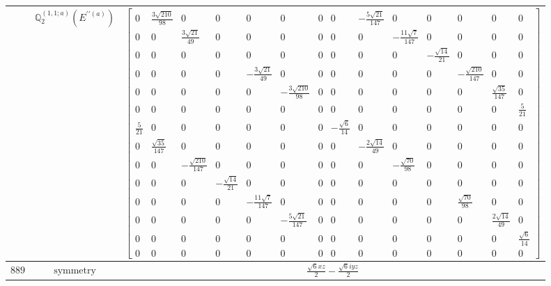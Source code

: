 \documentclass[fleqn,8pt,landscape]{jsarticle}
\begin{document}
\begin{longtable}{ccc}
$  $ & $ \mathbb{Q}_{2}^{(1,1;a)}(E^{\prime\prime(a)}) $ & $ \begin{bmatrix} 0 & \frac{3 \sqrt{210}}{98} & 0 & 0 & 0 & 0 & 0 & 0 & - \frac{5 \sqrt{21}}{147} & 0 & 0 & 0 & 0 & 0 \\ 0 & 0 & \frac{3 \sqrt{21}}{49} & 0 & 0 & 0 & 0 & 0 & 0 & - \frac{11 \sqrt{7}}{147} & 0 & 0 & 0 & 0 \\ 0 & 0 & 0 & 0 & 0 & 0 & 0 & 0 & 0 & 0 & - \frac{\sqrt{14}}{21} & 0 & 0 & 0 \\ 0 & 0 & 0 & 0 & - \frac{3 \sqrt{21}}{49} & 0 & 0 & 0 & 0 & 0 & 0 & - \frac{\sqrt{210}}{147} & 0 & 0 \\ 0 & 0 & 0 & 0 & 0 & - \frac{3 \sqrt{210}}{98} & 0 & 0 & 0 & 0 & 0 & 0 & \frac{\sqrt{35}}{147} & 0 \\ 0 & 0 & 0 & 0 & 0 & 0 & 0 & 0 & 0 & 0 & 0 & 0 & 0 & \frac{5}{21} \\ \frac{5}{21} & 0 & 0 & 0 & 0 & 0 & 0 & - \frac{\sqrt{6}}{14} & 0 & 0 & 0 & 0 & 0 & 0 \\ 0 & \frac{\sqrt{35}}{147} & 0 & 0 & 0 & 0 & 0 & 0 & - \frac{2 \sqrt{14}}{49} & 0 & 0 & 0 & 0 & 0 \\ 0 & 0 & - \frac{\sqrt{210}}{147} & 0 & 0 & 0 & 0 & 0 & 0 & - \frac{\sqrt{70}}{98} & 0 & 0 & 0 & 0 \\ 0 & 0 & 0 & - \frac{\sqrt{14}}{21} & 0 & 0 & 0 & 0 & 0 & 0 & 0 & 0 & 0 & 0 \\ 0 & 0 & 0 & 0 & - \frac{11 \sqrt{7}}{147} & 0 & 0 & 0 & 0 & 0 & 0 & \frac{\sqrt{70}}{98} & 0 & 0 \\ 0 & 0 & 0 & 0 & 0 & - \frac{5 \sqrt{21}}{147} & 0 & 0 & 0 & 0 & 0 & 0 & \frac{2 \sqrt{14}}{49} & 0 \\ 0 & 0 & 0 & 0 & 0 & 0 & 0 & 0 & 0 & 0 & 0 & 0 & 0 & \frac{\sqrt{6}}{14} \\ 0 & 0 & 0 & 0 & 0 & 0 & 0 & 0 & 0 & 0 & 0 & 0 & 0 & 0 \end{bmatrix} $ \\ \hline
$ 889 $ & $ \text{symmetry} $ & $ \frac{\sqrt{6} x z}{2} - \frac{\sqrt{6} i y z}{2} $ \\

\end{longtable}
\end{document}

